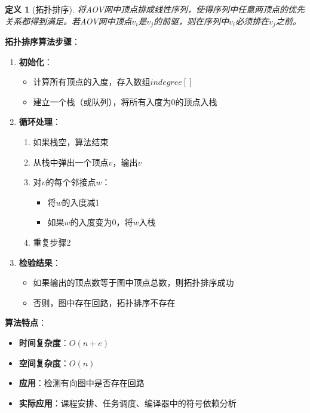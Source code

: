 \documentclass[12pt,a4paper]{amsart}
\newtheorem{definition}{定义}[section]
\begin{document}
\begin{definition}[拓扑排序]
将AOV网中顶点排成线性序列，使得序列中任意两顶点的优先关系都得到满足。若AOV网中顶点$v_i$是$v_j$的前驱，则在序列中$v_i$必须排在$v_j$之前。
\end{definition}

\textbf{拓扑排序算法步骤}：
\begin{enumerate}
    \item \textbf{初始化}：
    \begin{itemize}
        \item 计算所有顶点的入度，存入数组$indegree[]$
        \item 建立一个栈（或队列），将所有入度为0的顶点入栈
    \end{itemize}
    \item \textbf{循环处理}：
    \begin{enumerate}
        \item 如果栈空，算法结束
        \item 从栈中弹出一个顶点$v$，输出$v$
        \item 对$v$的每个邻接点$w$：
        \begin{itemize}
            \item 将$w$的入度减1
            \item 如果$w$的入度变为0，将$w$入栈
        \end{itemize}
        \item 重复步骤2
    \end{enumerate}
    \item \textbf{检验结果}：
    \begin{itemize}
        \item 如果输出的顶点数等于图中顶点总数，则拓扑排序成功
        \item 否则，图中存在回路，拓扑排序不存在
    \end{itemize}
\end{enumerate}

\textbf{算法特点}：
\begin{itemize}
    \item \textbf{时间复杂度}：$O(n+e)$
    \item \textbf{空间复杂度}：$O(n)$
    \item \textbf{应用}：检测有向图中是否存在回路
    \item \textbf{实际应用}：课程安排、任务调度、编译器中的符号依赖分析
\end{itemize}
\end{document}
